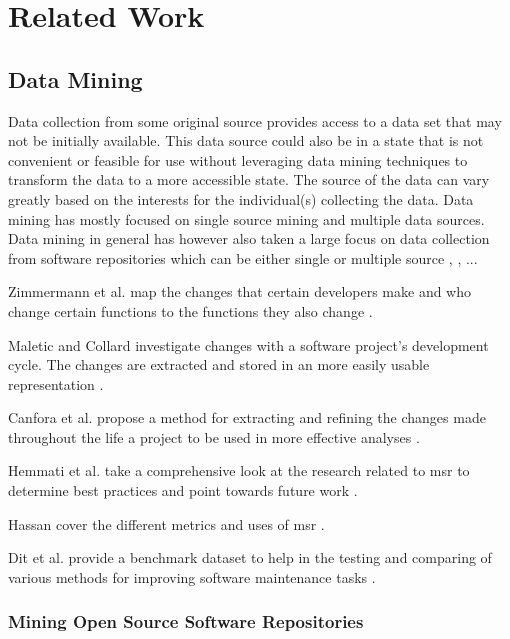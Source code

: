 \chapter{Related Work}
\label{chap:related_works}


\section{Data Mining}

Data collection from some original source provides access to a data set that may not be initially available. This data source could also be in a state that is not convenient or feasible for use without leveraging data mining techniques to transform the data to a more accessible state. The source of the data can vary greatly based on the interests for the individual(s) collecting the data. Data mining has mostly focused on single source mining and multiple data sources. Data mining in general has however also taken a large focus on data collection from software repositories which can be either single or multiple source \cite{Hemmati2013}, \cite{Hassan2006}, ... %

Zimmermann et al. map the changes that certain developers make and who change certain functions to the functions they also change \cite{Zimmermann2005a}. 

Maletic and Collard investigate changes with a software project's development cycle. The changes are extracted and stored in an more easily usable representation \cite{Maletic2004}.

Canfora et al. propose a method for extracting and refining the changes made throughout the life a project to be used in more effective analyses \cite{Canfora2007c}.

Hemmati et al. take a comprehensive look at the research related to \gls{msr} to determine best practices and point towards future work \cite{Hemmati2013}.

Hassan cover the different metrics and uses of \gls{msr} \cite{Hassan2006}.

Dit et al. provide a benchmark dataset to help in the testing and comparing of various methods for improving software maintenance tasks \cite{Dit2013}.

\subsection{Mining Open Source Software Repositories}

